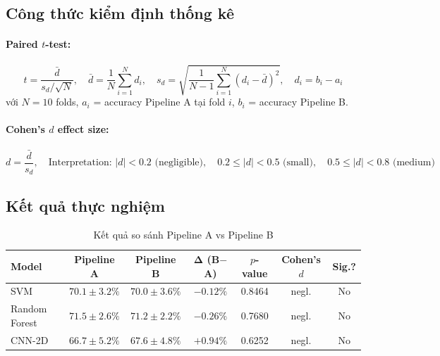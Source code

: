 \documentclass[12pt,a4paper]{article}
\begin{document}
\subsection{Công thức kiểm định thống kê}

\paragraph{Paired $t$-test:}
\begin{equation}
    t = \frac{\bar{d}}{s_d / \sqrt{N}}, \quad
    \bar{d} = \frac{1}{N}\sum_{i=1}^{N} d_i, \quad
    s_d = \sqrt{\frac{1}{N-1}\sum_{i=1}^{N}(d_i - \bar{d})^2}, \quad
    d_i = b_i - a_i
\end{equation}
với $N = 10$ folds, $a_i$ = accuracy Pipeline A tại fold $i$, $b_i$ = accuracy Pipeline B.

\paragraph{Cohen's $d$ effect size:}
\begin{equation}
    d = \frac{\bar{d}}{s_d}, \quad
    \text{Interpretation: } |d| < 0.2 \text{ (negligible)}, \quad
    0.2 \leq |d| < 0.5 \text{ (small)}, \quad
    0.5 \leq |d| < 0.8 \text{ (medium)}
\end{equation}

\subsection{Kết quả thực nghiệm}

\begin{table}[H]
\centering
\caption{Kết quả so sánh Pipeline A vs Pipeline B}
\label{tab:results}
\begin{tabular}{@{}lcccccc@{}}
\toprule
\textbf{Model} & \textbf{Pipeline A} & \textbf{Pipeline B} & $\boldsymbol{\Delta}$ \textbf{(B$-$A)} & \textbf{$p$-value} & \textbf{Cohen's $d$} & \textbf{Sig.?} \\
\midrule
SVM           & $70.1 \pm 3.2\%$ & $70.0 \pm 3.6\%$ & $-0.12\%$ & 0.8464 & negl. & No \\
Random Forest & $71.5 \pm 2.6\%$ & $71.2 \pm 2.2\%$ & $-0.26\%$ & 0.7680 & negl. & No \\
CNN-2D        & $66.7 \pm 5.2\%$ & $67.6 \pm 4.8\%$ & $+0.94\%$ & 0.6252 & negl. & No \\
\bottomrule
\end{tabular}
\end{table}
\end{document}
